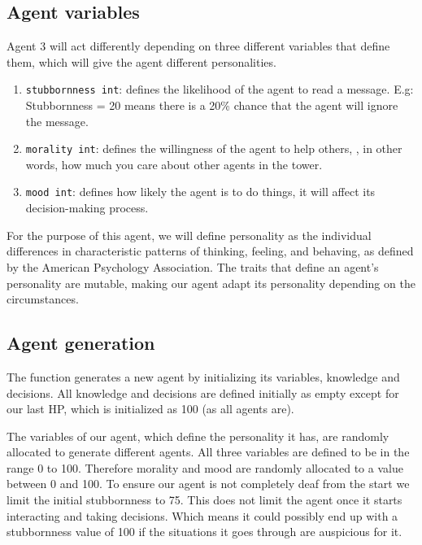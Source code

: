 \subsection{Agent variables}
Agent 3 will act differently depending on three different variables that define them, which will give the agent different personalities.
\begin{enumerate}
    \item \texttt{stubbornness int}: defines the likelihood of the agent to read a message. E.g: Stubbornness = 20 means there is a 20\% chance that the agent will ignore the message.
    \item \texttt{morality int}: defines the willingness of the agent to help others, \cite{waller_2015}, in other words, how much you care about other agents in the tower. 
    \item \texttt{mood int}: defines how likely the agent is to do things, it will affect its decision-making process.
\end{enumerate}
For the purpose of this agent, we will define personality as the individual differences in characteristic patterns of thinking, feeling, and behaving, as defined by the American Psychology Association. The traits that define an agent's personality are mutable, making our agent adapt its personality depending on the circumstances. 

\subsection{Agent generation}
The function generates a new agent by initializing its variables, knowledge and decisions. All knowledge and decisions are defined initially as empty except for our last HP, which is initialized as 100 (as all agents are). \par
The variables of our agent, which define the personality it has, are randomly allocated to generate different agents. All three variables are defined to be in the range 0 to 100. Therefore morality and mood are randomly allocated to a value between 0 and 100. To ensure our agent is not completely deaf from the start we limit the initial stubbornness to 75. This does not limit the agent once it starts interacting and taking decisions. Which means it could possibly end up with a stubbornness value of 100 if the situations it goes through are auspicious for it.


